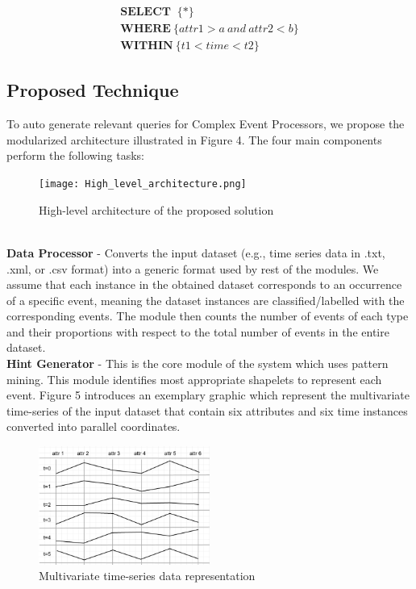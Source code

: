 \documentclass[conference]{IEEEtran}  %
\begin{document}
\begin{equation}
\begin{split}
\textbf{SELECT }\ \{*\} \\ \textbf{WHERE}\ \{attr1>a\ and \ attr2<b\} \\ \textbf{WITHIN}\ \{t1<time<t2\}
\end{split}
\end{equation}

\subsection{Proposed Technique}
To auto generate relevant queries for Complex Event Processors, we propose the modularized architecture illustrated in Figure 4. The four main components perform the following tasks:
\begin{figure}[h!]
\texttt{[image: High\_level\_architecture.png]}
\caption{High-level architecture of the proposed solution}
\end{figure}
\smallskip\\
\textbf{Data Processor} - Converts the input dataset (e.g., time series data in .txt, .xml, or .csv format) into a generic format used by rest of the modules. We assume that each instance in the obtained dataset corresponds to an occurrence of a specific event, meaning the dataset instances are classified/labelled with the corresponding events. The module then counts  the number of events of each type and their proportions with respect to the total number of events in the entire dataset.
\smallskip\\
\textbf{Hint Generator}	- This is the core module of the system which uses pattern mining. This module identifies most appropriate shapelets to represent each event. Figure 5 introduces an exemplary graphic which represent the multivariate time-series of the input dataset that contain six attributes and six time instances converted into parallel coordinates.

\begin{figure}[h!]
\includegraphics[width=0.5\textwidth]{multivariateTime.png}
\caption{Multivariate time-series data representation}
\end{figure}
\end{document}
